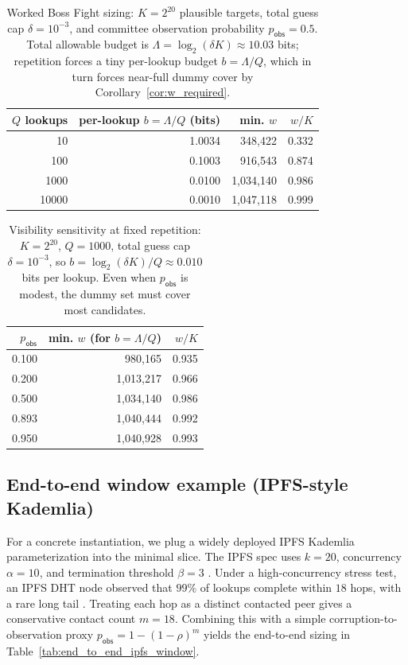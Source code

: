 \documentclass[11pt]{article}
\begin{document}
\begin{table}[t]
\centering
\caption{Worked Boss Fight sizing: $K=2^{20}$ plausible targets, total guess cap $\delta=10^{-3}$, and committee observation probability $p_{\mathsf{obs}}=0.5$. Total allowable budget is $\Lambda=\log_2(\delta K)\approx10.03$ bits; repetition forces a tiny per-lookup budget $b=\Lambda/Q$, which in turn forces near-full dummy cover by Corollary~\ref{cor:w_required}.}
\label{tab:worked-repetition}
\begin{tabular}{r r r r}
\toprule
$Q$ lookups & per-lookup $b=\Lambda/Q$ (bits) & min. $w$ & $w/K$ \\
\midrule
10 & 1.0034 & 348,422 & 0.332 \\
100 & 0.1003 & 916,543 & 0.874 \\
1000 & 0.0100 & 1,034,140 & 0.986 \\
10000 & 0.0010 & 1,047,118 & 0.999 \\
\bottomrule
\end{tabular}
\end{table}

\begin{table}[t]
\centering
\caption{Visibility sensitivity at fixed repetition: $K=2^{20}$, $Q=1000$, total guess cap $\delta=10^{-3}$, so $b=\log_2(\delta K)/Q\approx0.010$ bits per lookup. Even when $p_{\mathsf{obs}}$ is modest, the dummy set must cover most candidates.}
\label{tab:pobs-sweep}
\begin{tabular}{r r r}
\toprule
$p_{\mathsf{obs}}$ & min. $w$ (for $b=\Lambda/Q$) & $w/K$ \\
\midrule
0.100 & 980,165 & 0.935 \\
0.200 & 1,013,217 & 0.966 \\
0.500 & 1,034,140 & 0.986 \\
0.893 & 1,040,444 & 0.992 \\
0.950 & 1,040,928 & 0.993 \\
\bottomrule
\end{tabular}
\end{table}


\subsection{End-to-end window example (IPFS-style Kademlia)}\label{sec:endtoend}
For a concrete instantiation, we plug a widely deployed IPFS Kademlia parameterization into the minimal slice. The IPFS spec uses $k{=}20$, concurrency $\alpha{=}10$, and termination threshold $\beta{=}3$ \cite{ipfs_kad_spec}. Under a high-concurrency stress test, an IPFS DHT node observed that $99\%$ of lookups complete within $18$ hops, with a rare long tail \cite{cortes2024kadlimits}. Treating each hop as a distinct contacted peer gives a conservative contact count $m=18$. Combining this with a simple corruption-to-observation proxy $p_{\mathsf{obs}}=1-(1-\rho)^m$ yields the end-to-end sizing in Table~\ref{tab:end_to_end_ipfs_window}.
\end{document}

